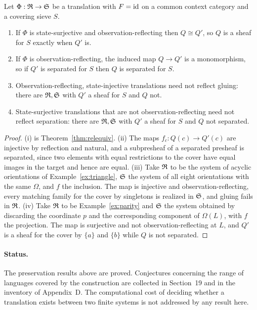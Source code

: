 \begin{proposition}\label{prop:reconstruction}
Let $\Phi:\mathfrak R\to\mathfrak S$ be a translation with $F=\mathrm{id}$ on a common context category and a covering sieve $S$.
\begin{enumerate}[label=(\roman*)]
\item If $\Phi$ is state-surjective and observation-reflecting then $Q\cong Q'$, so $Q$ is a sheaf for $S$ exactly when $Q'$ is.
\item If $\Phi$ is observation-reflecting, the induced map $Q\to Q'$ is a monomorphism, so if $Q'$ is separated for $S$ then $Q$ is separated for $S$.
\item Observation-reflecting, state-injective translations need not reflect gluing: there are $\mathfrak R,\mathfrak S$ with $Q'$ a sheaf for $S$ and $Q$ not.
\item State-surjective translations that are not observation-reflecting need not reflect separation: there are $\mathfrak R,\mathfrak S$ with $Q'$ a sheaf for $S$ and $Q$ not separated.
\end{enumerate}
\end{proposition}
\begin{proof}
(i) is Theorem~\ref{thm:relequiv}. (ii) The maps $f_c:Q(c)\to Q'(c)$ are injective by reflection and natural, and a subpresheaf of a separated presheaf is separated, since two elements with equal restrictions to the cover have equal images in the target and hence are equal. (iii) Take $\mathfrak R$ to be the system of acyclic orientations of Example~\ref{ex:triangle}, $\mathfrak S$ the system of all eight orientations with the same $\Omega$, and $f$ the inclusion. The map is injective and observation-reflecting, every matching family for the cover by singletons is realized in $\mathfrak S$, and gluing fails in $\mathfrak R$. (iv) Take $\mathfrak R$ to be Example~\ref{ex:parity} and $\mathfrak S$ the system obtained by discarding the coordinate $p$ and the corresponding component of $\Omega(L)$, with $f$ the projection. The map is surjective and not observation-reflecting at $L$, and $Q'$ is a sheaf for the cover by $\{a\}$ and $\{b\}$ while $Q$ is not separated.
\end{proof}

\paragraph{Status.} The preservation results above are proved. Conjectures concerning the range of languages covered by the construction are collected in Section~19 and in the inventory of Appendix~D. The computational cost of deciding whether a translation exists between two finite systems is not addressed by any result here.

